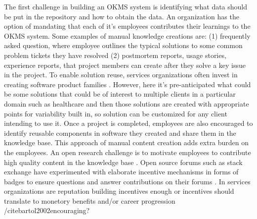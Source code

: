The first challenge in building an OKMS system is identifying what data should be put in the repository and how to obtain the data. An organization has the option of mandating that each of it's employees contributes their learnings to the OKMS system. Some examples of manual knowledge creations are: (1) frequently asked question, where employee outlines the typical solutions to some common problem tickets they have resolved (2) postmortem reports, usage stories, experience reports\cite{desouza:2005}, that project members can create after they solve a key issue in the project. To enable solution reuse, services organizations often invest in creating software product families \cite{clements2002software}. However, here it's pre-anticipated what could be some solutions that could be of interest to multiple clients in a particular domain such as healthcare and then those solutions are created with appropriate points for variability built in, so solution can be customized for any client intending to use it.  Once a project is completed, employees are also encouraged to identify reusable components in software they created and share them in the knowledge base. This approach of manual content creation adds extra burden on the employees. An open research challenge is to motivate employees to contribute high quality content in the knowledge base \cite{hendriks1999share}. Open source forums such as stack exchange have experimented with elaborate incentive mechanisms in forms of badges to ensure questions and answer contributions on their forums \cite{vasilescu2014social}. In services organizations are reputation building incentives enough or incentives should translate to monetory benefits and/or career progression /cite{bartol2002encouraging}? 

